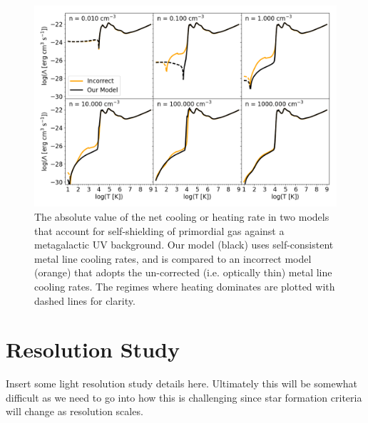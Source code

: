\documentclass[twocolumn]{aastex61}
\begin{document}
\begin{figure}
\centering
\includegraphics[width=0.95\linewidth]{cooling_model_comparison}
\caption{The absolute value of the net cooling or heating rate 
 in two models that account for self-shielding of primordial gas against a metagalactic UV background. Our model (black) uses self-consistent metal line cooling rates, and is compared to an incorrect model (orange) that adopts the un-corrected (i.e. optically thin) metal line cooling rates. The regimes where heating dominates are plotted with dashed lines for clarity.}
\label{fig:cooling comparison}
\end{figure}

\section{Resolution Study}
\label{appendix:resolution study}
Insert some light resolution study details here. Ultimately this will be somewhat difficult as we need to go into how this is challenging since star formation criteria will change as resolution scales.

\end{document}
